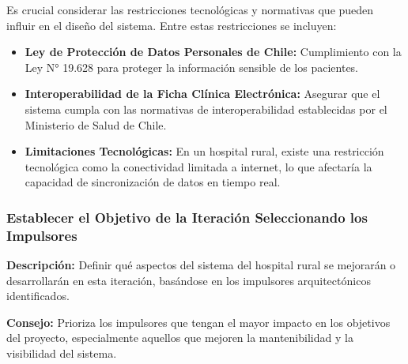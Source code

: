 Es crucial considerar las restricciones tecnológicas y normativas que pueden influir en el diseño del sistema. Entre estas restricciones se incluyen:

\begin{itemize}
    \item \textbf{Ley de Protección de Datos Personales de Chile:} Cumplimiento con la Ley N° 19.628 para proteger la información sensible de los pacientes.
    \item \textbf{Interoperabilidad de la Ficha Clínica Electrónica:} Asegurar que el sistema cumpla con las normativas de interoperabilidad establecidas por el Ministerio de Salud de Chile.
    \item \textbf{Limitaciones Tecnológicas:} En un hospital rural, existe una restricción tecnológica como la conectividad limitada a internet, lo que afectaría la capacidad de sincronización de datos en tiempo real.
\end{itemize}







\subsubsection{Establecer el Objetivo de la Iteración Seleccionando los Impulsores}

\textbf{Descripción:} Definir qué aspectos del sistema del hospital rural se mejorarán o desarrollarán en esta iteración, basándose en los impulsores arquitectónicos identificados.

\textbf{Consejo:} Prioriza los impulsores que tengan el mayor impacto en los objetivos del proyecto, especialmente aquellos que mejoren la mantenibilidad y la visibilidad del sistema.

